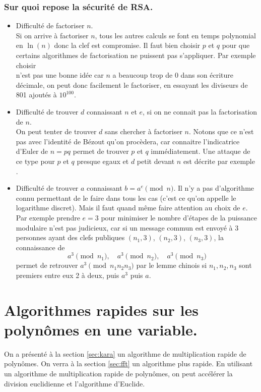 \documentclass[a4paper,11pt]{book}
\begin{document}
\begin{giacjshere}
\subsubsection{Sur quoi repose la s\'ecurit\'e de RSA.}
\begin{itemize}
\item Difficult\'e de factoriser $n$. \\ Si on arrive \`a factoriser
$n$, tous les autres calculs se font en temps polynomial en $\ln(n)$
donc la clef est compromise. Il faut bien choisir $p$ et $q$ pour
que certains algorithmes de factorisation ne puissent pas s'appliquer.
Par exemple choisir\\
n'est pas une bonne id\'ee car $n$ a beaucoup trop de 0 dans son
\'ecriture d\'ecimale, on peut donc facilement le factoriser, en
essayant les diviseurs de 801 ajout\'es \`a $10^{100}$.
\item
Difficult\'e de trouver $d$ connaissant $n$ et $e$, si on ne connait pas
la factorisation de $n$.\\
On peut tenter de trouver $d$ sans chercher \`a factoriser $n$. Notons
que ce n'est pas avec l'identit\'e de B\'ezout qu'on proc\`edera, car
connaitre l'indicatrice d'Euler de $n=pq$ permet de trouver $p$ et $q$
imm\'ediatement. 
Une attaque de ce type pour $p$ et $q$ presque egaux et $d$ petit
devant $n$ est d\'ecrite par exemple 
.
\item Difficult\'e de trouver $a$ connaissant $b=a^e \pmod n$.
Il n'y a pas d'algorithme connu permettant de le faire dans tous les
cas (c'est ce qu'on appelle le logarithme discret). 
Mais il faut quand m\^eme faire attention au choix de $e$.
Par exemple prendre $e=3$ pour minimiser le nombre d'\'etapes
de la puissance modulaire n'est pas judicieux, car si un message
commun est envoy\'e \`a 3 personnes ayant des clefs publiques 
$(n_1,3)$, $(n_2,3)$, $(n_3,3)$, la connaissance de 
$$ a^3 \pmod{ n_1}, \quad a^3 \pmod{ n_2}, \quad a^3 \pmod{ n_3} $$
permet de retrouver $a^3 \pmod{ n_1n_2n_3}$ par le lemme chinois si
$n_1,n_2,n_3$ sont premiers entre eux 2 \`a deux, puis $a^3$ puis $a$.
\end{itemize}

\section{Algorithmes rapides sur les polyn\^omes en une variable.}
On a pr\'esent\'e \`a la section \ref{sec:kara} un algorithme 
de multiplication rapide de polyn\^omes. On verra \`a la
section \ref{sec:fft} un algorithme plus rapide.
En utilisant un algorithme de multiplication rapide de polyn\^omes,
on peut acc\'el\'erer la division euclidienne et l'algorithme d'Euclide.


\end{giacjshere}
\end{document}
